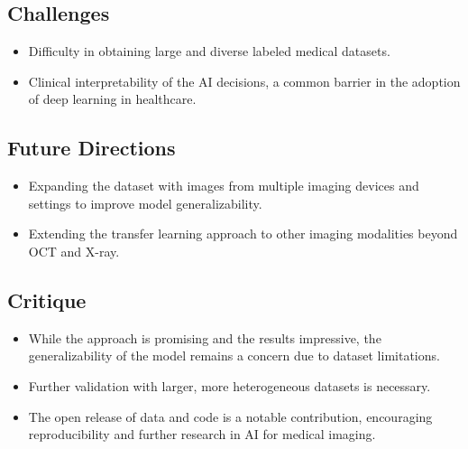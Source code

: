\subsection*{Challenges}
\begin{itemize}
    \item Difficulty in obtaining large and diverse labeled medical datasets.
    \item Clinical interpretability of the AI decisions, a common barrier in the adoption of deep learning in healthcare.
\end{itemize}

\subsection*{Future Directions}
\begin{itemize}
    \item Expanding the dataset with images from multiple imaging devices and settings to improve model generalizability.
    \item Extending the transfer learning approach to other imaging modalities beyond OCT and X-ray.
\end{itemize}

\subsection*{Critique}
\begin{itemize}
    \item While the approach is promising and the results impressive, the generalizability of the model remains a concern due to dataset limitations.
    \item Further validation with larger, more heterogeneous datasets is necessary.
    \item The open release of data and code is a notable contribution, encouraging reproducibility and further research in AI for medical imaging.
\end{itemize}



